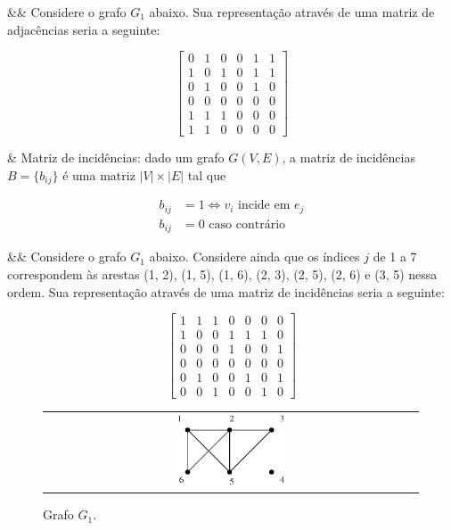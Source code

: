\begin{easylist}
  && Considere o grafo $G_1$ abaixo. Sua representação através de uma matriz de adjacências seria a seguinte:
\end{easylist}

\[
  \begin{bmatrix}
    0 & 1 & 0  &  0 & 1 & 1  \\
    1 & 0 & 1  &  0 & 1 & 1  \\
    0 & 1 & 0  &  0 & 1 & 0  \\
    0 & 0 & 0  &  0 & 0 & 0  \\
    1 & 1 & 1  &  0 & 0 & 0  \\
    1 & 1 & 0  &  0 & 0 & 0
  \end{bmatrix}
\]

\begin{easylist}
  & Matriz de incidências: dado um grafo $G(V, E)$, a matriz de incidências $B = \{b_{ij}\}$ é uma matriz $|V| \times |E|$ tal que
\end{easylist}

  \begin{equation*}
    \begin{split}
b_{ij} & = 1 \Leftrightarrow v_i \mbox{ incide em } e_j \\
b_{ij} & = 0 \mbox{ caso contrário }
    \end{split}
  \end{equation*}

\begin{easylist}
  && Considere o grafo $G_1$ abaixo. Considere ainda que os índices $j$ de 1 a 7 correspondem às arestas (1, 2), (1, 5), (1, 6), (2, 3), (2, 5), (2, 6) e (3, 5) nessa ordem. Sua representação através de uma matriz de incidências seria a seguinte:
\end{easylist}

\[
  \begin{bmatrix}
    1 & 1 & 1  &  0 & 0 & 0  &  0 \\
    1 & 0 & 0  &  1 & 1 & 1  &  0 \\
    0 & 0 & 0  &  1 & 0 & 0  &  1 \\
    0 & 0 & 0  &  0 & 0 & 0  &  0 \\
    0 & 1 & 0  &  0 & 1 & 0  &  1 \\
    0 & 0 & 1  &  0 & 0 & 1  &  0
  \end{bmatrix}
\]

\begin{figure}[h!]
  \begin{center}
    \begin{tabular}{c}
      \includegraphics[width=0.3\textwidth]{images/02/graph01.eps}
    \end{tabular}
  \end{center}
  \caption*{\label{fig:ex:01} Grafo $G_1$.}
\end{figure}

